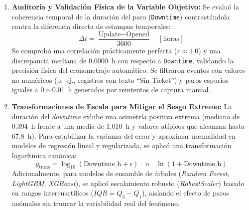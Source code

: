 \documentclass[conference]{IEEEtran}
\begin{document}
\begin{enumerate}
    \item \textbf{Auditoría y Validación Física de la Variable Objetivo:} 
    Se evaluó la coherencia temporal de la duración del paro (\texttt{Downtime}) contrastándola contra la diferencia directa de estampas temporales:
    \begin{equation}
        \Delta t = \frac{\text{Update} - \text{Opened}}{3600} \quad [\text{horas}]
    \end{equation}
    Se comprobó una correlación prácticamente perfecta ($r \approx 1.0$) y una discrepancia mediana de $0.0000$~h con respecto a \texttt{Downtime}, validando la precisión física del cronometraje automático. Se filtraron eventos con valores no numéricos (p.~ej., registros con texto ``Sin Ticket'') y paros espurios iguales a 0 o 0.01~h generados por reintentos de captura manual.
    
    \item \textbf{Transformaciones de Escala para Mitigar el Sesgo Extremo:}
    La duración del \textit{downtime} exhibe una asimetría positiva extrema (mediana de 0.394~h frente a una media de 1.010~h y valores atípicos que alcanzan hasta 67.8~h). Para estabilizar la varianza del error y aproximar normalidad en modelos de regresión lineal y regularizada, se aplicó una transformación logarítmica canónica:
    \begin{equation}
        y_{\text{trans}} = \log_{10}(\text{Downtime\_h} + \epsilon) \quad \text{o} \quad \ln(1 + \text{Downtime\_h})
    \end{equation}
    Adicionalmente, para modelos de ensamble de árboles (\textit{Random Forest}, \textit{LightGBM}, \textit{XGBoost}), se aplicó escalamiento robusto (\textit{RobustScaler}) basado en rangos intercuartílicos ($IQR = Q_3 - Q_1$), aislando el efecto de paros anómalos sin truncar la variabilidad real del fenómeno.


\end{enumerate}
\end{document}
